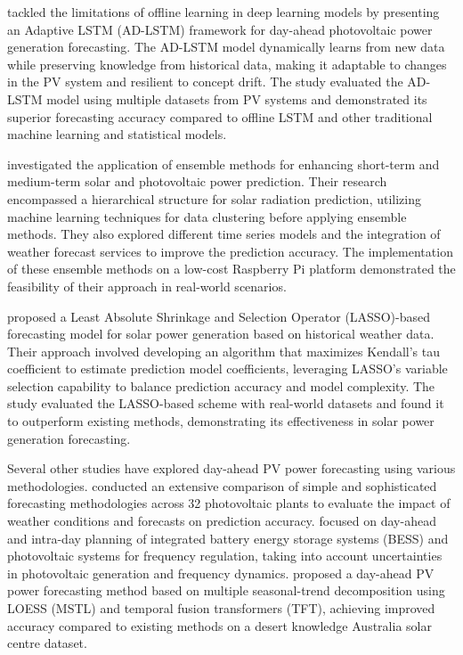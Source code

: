 \citet{Perera_2024} tackled the limitations of offline learning in deep learning models by presenting an Adaptive LSTM (AD-LSTM) framework for day-ahead photovoltaic power generation forecasting. The AD-LSTM model dynamically learns from new data while preserving knowledge from historical data, making it adaptable to changes in the PV system and resilient to concept drift. The study evaluated the AD-LSTM model using multiple datasets from PV systems and demonstrated its superior forecasting accuracy compared to offline LSTM and other traditional machine learning and statistical models.

\citet{Dao_2020} investigated the application of ensemble methods for enhancing short-term and medium-term solar and photovoltaic power prediction. Their research encompassed a hierarchical structure for solar radiation prediction, utilizing machine learning techniques for data clustering before applying ensemble methods. They also explored different time series models and the integration of weather forecast services to improve the prediction accuracy. The implementation of these ensemble methods on a low-cost Raspberry Pi platform demonstrated the feasibility of their approach in real-world scenarios.

\citet{Tang_2018} proposed a Least Absolute Shrinkage and Selection Operator (LASSO)-based forecasting model for solar power generation based on historical weather data. Their approach involved developing an algorithm that maximizes Kendall's tau coefficient to estimate prediction model coefficients, leveraging LASSO's variable selection capability to balance prediction accuracy and model complexity. The study evaluated the LASSO-based scheme with real-world datasets and found it to outperform existing methods, demonstrating its effectiveness in solar power generation forecasting.

Several other studies have explored day-ahead PV power forecasting using various methodologies. \citet{Gigoni_2018} conducted an extensive comparison of simple and sophisticated forecasting methodologies across 32 photovoltaic plants to evaluate the impact of weather conditions and forecasts on prediction accuracy. \citet{Conte_2020} focused on day-ahead and intra-day planning of integrated battery energy storage systems (BESS) and photovoltaic systems for frequency regulation, taking into account uncertainties in photovoltaic generation and frequency dynamics. \citet{jiang2023dayahead} proposed a day-ahead PV power forecasting method based on multiple seasonal-trend decomposition using LOESS (MSTL) and temporal fusion transformers (TFT), achieving improved accuracy compared to existing methods on a desert knowledge Australia solar centre dataset.

